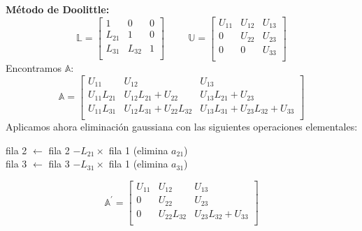 \documentclass[9pt, aspectratio=169]{beamer}
\begin{document}
\begin{frame}
\textbf{Método de Doolittle:}
 \begin{equation*}
\mathbb{L} = \left[ 
 \begin{array}{ccc}
 1 & 0 & 0 \\
 L_{21} & 1 & 0 \\
 L_{31} & L_{32} &1 \\
 \end{array} \right] \hspace{1cm} 
\mathbb{U} = \left[ 
 \begin{array}{ccc}
 U_{11} & U_{12} & U_{13} \\
 0 & U_{22} & U_{23} \\
 0 & 0 & U_{33} \\
 \end{array} \right]
 \end{equation*}
Encontramos $\mathbb{A}$:
\begin{equation*}
 \mathbb{A}= \left[ \begin{array}{lll}
 U_{11} & U_{12} & U_{13} \\
 U_{11} L_{21} & U_{12} L_{21}+U_{22} & U_{13} L_{21} + U_{23} \\
 U_{11} L_{31} & U_{12} L_{31}+U_{22}L_{32} & U_{13} L_{31}+U_{23} L_{32} + U_{33} \\
 \end{array} \right]
\end{equation*} \pause
Aplicamos ahora eliminación gaussiana con las siguientes operaciones elementales:
\begin{center}
 fila 2 $\leftarrow$ fila 2 $- L_{21} \times$ fila 1 (elimina $a_{21}$) \\
 fila 3 $\leftarrow$ fila 3 $- L_{31} \times$ fila 1 (elimina $a_{31}$)
\end{center}
\begin{equation*}
 \mathbb{A}^{\prime}= \left[ \begin{array}{ccc}
 U_{11} & U_{12} & U_{13} \\
 0 & U_{22} & U_{23} \\
 0 & U_{22}L_{32} & U_{23} L_{32} + U_{33} \\
 \end{array} \right]
\end{equation*}
\end{frame}
\end{document}
